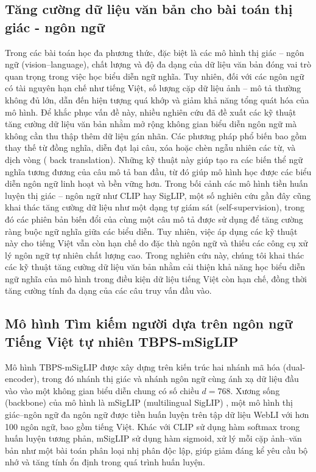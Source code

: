 \documentclass{jstarticle}
\begin{document}
\subsection{Tăng cường dữ liệu văn bản cho bài toán thị giác - ngôn ngữ}
Trong các bài toán học đa phương thức, đặc biệt là các mô hình thị giác – ngôn ngữ (vision–language), chất lượng và độ đa dạng của dữ liệu văn bản đóng vai trò quan trọng trong việc học biểu diễn ngữ nghĩa. Tuy nhiên, đối với các ngôn ngữ có tài nguyên hạn chế như tiếng Việt, số lượng cặp dữ liệu ảnh – mô tả thường không đủ lớn, dẫn đến hiện tượng quá khớp và giảm khả năng tổng quát hóa của mô hình.
Để khắc phục vấn đề này, nhiều nghiên cứu đã đề xuất các kỹ thuật tăng cường dữ liệu văn bản nhằm mở rộng không gian biểu diễn ngôn ngữ mà không cần thu thập thêm dữ liệu gán nhãn. Các phương pháp phổ biến bao gồm thay thế từ đồng nghĩa, diễn đạt lại câu, xóa hoặc chèn ngẫu nhiên các từ, và dịch vòng ( back translation). Những kỹ thuật này giúp tạo ra các biến thể ngữ nghĩa tương đương của câu mô tả ban đầu, từ đó giúp mô hình học được các biểu diễn ngôn ngữ linh hoạt và bền vững hơn.
Trong bối cảnh các mô hình tiền huấn luyện thị giác – ngôn ngữ như CLIP hay SigLIP, một số nghiên cứu gần đây cũng khai thác tăng cường dữ liệu như một dạng tự giám sát (self-supervision), trong đó các phiên bản biến đổi của cùng một câu mô tả được sử dụng để tăng cường ràng buộc ngữ nghĩa giữa các biểu diễn. Tuy nhiên, việc áp dụng các kỹ thuật này cho tiếng Việt vẫn còn hạn chế do đặc thù ngôn ngữ và thiếu các công cụ xử lý ngôn ngữ tự nhiên chất lượng cao.
Trong nghiên cứu này, chúng tôi khai thác các kỹ thuật tăng cường dữ liệu văn bản nhằm cải thiện khả năng học biểu diễn ngữ nghĩa của mô hình trong điều kiện dữ liệu tiếng Việt còn hạn chế, đồng thời tăng cường tính đa dạng của các câu truy vấn đầu vào.
\subsection{Mô hình Tìm kiếm người dựa trên ngôn ngữ Tiếng Việt tự nhiên TBPS-mSigLIP}
\label{subsec:tbps-msiglip}

Mô hình TBPS-mSigLIP \cite{tran2025multilingual} được xây dựng trên kiến trúc hai nhánh mã hóa (dual-encoder), trong đó nhánh thị giác và nhánh ngôn ngữ cùng ánh xạ dữ liệu đầu vào vào một không gian biểu diễn chung có số chiều $d = 768$. Xương sống (backbone) của mô hình là mSigLIP (multilingual SigLIP) \cite{zhai2023sigmoid}, một mô hình thị giác–ngôn ngữ đa ngôn ngữ được tiền huấn luyện trên tập dữ liệu WebLI \cite{chen2022pali} với hơn 100 ngôn ngữ, bao gồm tiếng Việt. Khác với CLIP \cite{radford2021learning} sử dụng hàm softmax trong huấn luyện tương phản, mSigLIP sử dụng hàm sigmoid, xử lý mỗi cặp ảnh–văn bản như một bài toán phân loại nhị phân độc lập, giúp giảm đáng kể yêu cầu bộ nhớ và tăng tính ổn định trong quá trình huấn luyện.
\end{document}

